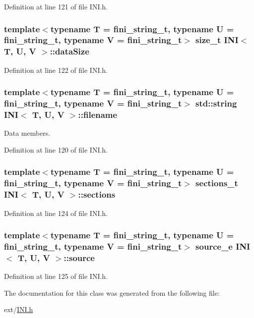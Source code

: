 Definition at line 121 of file I\+N\+I.\+h.

\hypertarget{class_i_n_i_a602d6b20ea275f3e654f1508a95ceea6}{}
\subsubsection[{data\+Size}]{\setlength{\rightskip}{0pt plus 5cm}template$<$typename T = fini\+\_\+string\+\_\+t, typename U = fini\+\_\+string\+\_\+t, typename V = fini\+\_\+string\+\_\+t$>$ size\+\_\+t {\bf I\+N\+I}$<$ T, U, V $>$\+::data\+Size}\label{class_i_n_i_a602d6b20ea275f3e654f1508a95ceea6}


Definition at line 122 of file I\+N\+I.\+h.

\hypertarget{class_i_n_i_af52e483d586ea3416df114e70755e96c}{}
\subsubsection[{filename}]{\setlength{\rightskip}{0pt plus 5cm}template$<$typename T = fini\+\_\+string\+\_\+t, typename U = fini\+\_\+string\+\_\+t, typename V = fini\+\_\+string\+\_\+t$>$ std\+::string {\bf I\+N\+I}$<$ T, U, V $>$\+::filename}\label{class_i_n_i_af52e483d586ea3416df114e70755e96c}


Data members. 



Definition at line 120 of file I\+N\+I.\+h.

\hypertarget{class_i_n_i_ab1825501769c4bb2cdc1d7ddd6a7be7a}{}
\subsubsection[{sections}]{\setlength{\rightskip}{0pt plus 5cm}template$<$typename T = fini\+\_\+string\+\_\+t, typename U = fini\+\_\+string\+\_\+t, typename V = fini\+\_\+string\+\_\+t$>$ {\bf sections\+\_\+t} {\bf I\+N\+I}$<$ T, U, V $>$\+::sections}\label{class_i_n_i_ab1825501769c4bb2cdc1d7ddd6a7be7a}


Definition at line 124 of file I\+N\+I.\+h.

\hypertarget{class_i_n_i_a0a65472be1d0807d6ad380dc0b7b29d3}{}
\subsubsection[{source}]{\setlength{\rightskip}{0pt plus 5cm}template$<$typename T = fini\+\_\+string\+\_\+t, typename U = fini\+\_\+string\+\_\+t, typename V = fini\+\_\+string\+\_\+t$>$ {\bf source\+\_\+e} {\bf I\+N\+I}$<$ T, U, V $>$\+::source}\label{class_i_n_i_a0a65472be1d0807d6ad380dc0b7b29d3}


Definition at line 125 of file I\+N\+I.\+h.



The documentation for this class was generated from the following file\+:\begin{DoxyCompactItemize}
\item 
ext/\hyperlink{_i_n_i_8h}{I\+N\+I.\+h}\end{DoxyCompactItemize}
